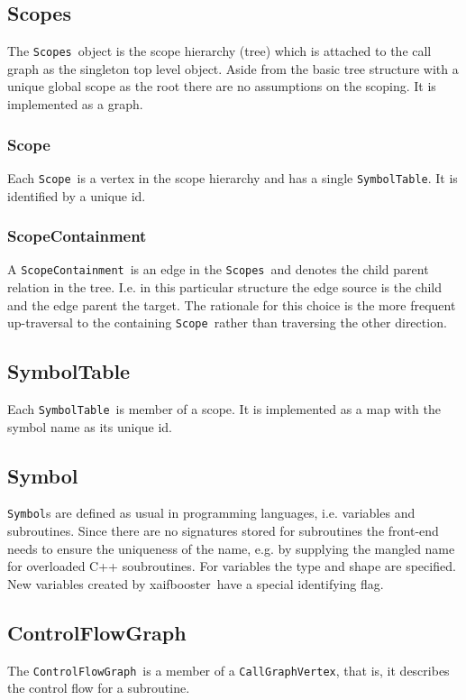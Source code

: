 \documentclass{book}
\newcommand{\xaifbooster}{xaifbooster}
\newcommand{\CallGraphVertex}{{\tt CallGraphVertex}}
\newcommand{\ControlFlowGraph}{{\tt ControlFlowGraph}}
\newcommand{\Scope}{{\tt Scope}}
\newcommand{\ScopeContainment}{{\tt ScopeContainment}}
\newcommand{\Scopes}{{\tt Scopes}}
\newcommand{\Symbol}{{\tt Symbol}}
\newcommand{\SymbolTable}{{\tt SymbolTable}}
\begin{document}
\subsection{Scopes}
\label{ssec:Scopes}

The \Scopes\ object is the scope hierarchy (tree) which 
is attached to the call graph as the singleton top level object. 
Aside from the basic tree structure with a unique global 
scope as the root there are 
no assumptions on the scoping. 
It is implemented as a graph.

\subsubsection{Scope} 
Each \Scope\ is a vertex in the scope hierarchy and has a single 
\SymbolTable. 
It is identified by a unique id. 

\subsubsection{ScopeContainment} 
A \ScopeContainment\ is an edge in the \Scopes\ and 
denotes the child parent relation in the tree. I.e. in this 
particular structure the edge source is the child and the 
edge parent the target. The rationale for this choice is 
the more frequent up-traversal to the containing \Scope\ rather 
than traversing the other direction.

\subsection{SymbolTable}
\label{ssec:SymbolTable}
Each \SymbolTable\ is member of a scope. It is implemented 
as a map with the symbol name as its unique id.

\subsection{Symbol}
\label{ssec:Symbol}
{\Symbol}s are defined as usual in programming languages, i.e. 
variables and subroutines. Since there are no signatures stored 
for subroutines the front-end needs to ensure the uniqueness of 
the name, e.g. by supplying the mangled name for overloaded 
C++ soubroutines. For variables the type and shape 
are specified. New variables created by \xaifbooster\ have a 
special identifying flag.

\subsection{ControlFlowGraph}
\label{ssec:ControlFlowGraph}
The \ControlFlowGraph\ is a member of a \CallGraphVertex, that is, 
it describes the control flow for a subroutine.
\end{document}
